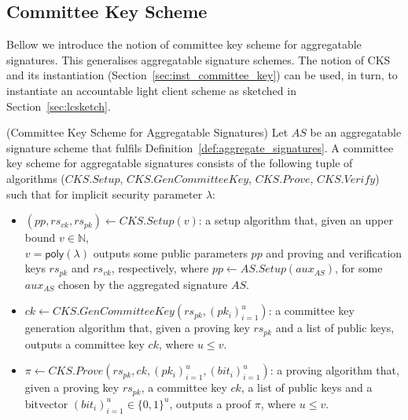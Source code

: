 \subsection{Committee Key Scheme}
\label{sec:committee_key}
Bellow we introduce the notion of committee key scheme for aggregatable signatures. This generalises aggregatable signature schemes. 
The notion of CKS and its instantiation (Section~\ref{sec:inst_committee_key}) can be used, in turn, to instantiate an accountable light client 
scheme as sketched in Section~\ref{sec:lcsketch}.
\begin{definition}
\label{def: committee_key} (Committee Key Scheme for Aggregatable Signatures) Let $\mathit{AS}$ be an aggregatable signature scheme that fulfils 
Definition~\ref{def:aggregate_signatures}.  A committee key scheme for aggregatable signatures consists of the following tuple of algorithms 
($\mathit{CKS.Setup}$, $\mathit{CKS.GenCommitteeKey}$, $\mathit{CKS.Prove}$, $\mathit{CKS.Verify}$) 
such that for implicit security parameter $\lambda$: 

\begin{itemize}
\item $(\mathit{pp}, \mathit{rs}_{\mathit{vk}}, \mathit{rs}_{\mathit{pk}}) \leftarrow \mathit{CKS.Setup}(v)$: a setup algorithm that, 
given an upper bound $v \in \mathbb{N}$, \\ $v = \mathsf{poly}(\lambda)$ outputs some public parameters $\mathit{pp}$ and 
proving and verification keys $\mathit{rs}_{\mathit{pk}}$ and $\mathit{rs}_{\mathit{vk}}$, respectively,  
where $\mathit{pp} \leftarrow \mathit{AS.Setup}(\mathit{aux_{\mathit{AS}}})$, for some 
$\mathit{aux_{\mathit{AS}}}$ chosen by the aggregated signature $\mathit{AS}$.

\item $\mathit{ck} \leftarrow \mathit{CKS.GenCommitteeKey}(\mathit{rs}_{\mathit{pk}}, (\mathit{pk_i})_{i=1}^u)$: a committee key generation algorithm that, 
given a proving key $\mathit{rs}_{\mathit{pk}}$ and a list of public keys, 
outputs a committee key $\mathit{ck}$, where $u \leq v$.

\item $\pi \leftarrow \mathit{CKS.Prove}(\mathit{rs}_{\mathit{pk}}, \mathit{ck}, (\mathit{pk_i})_{i=1}^u, (\mathit{bit_i})_{i=1}^u)$: a proving algorithm that, 
given a proving key $\mathit{rs}_{\mathit{pk}}$, a committee key $\mathit{ck}$, a list of public keys and a bitvector $(\mathit{bit_i})_{i=1}^u \in \{0,1\}^u$,  
outputs a proof $\pi$, where $u \leq v$.
 

\end{itemize}
\end{definition}
